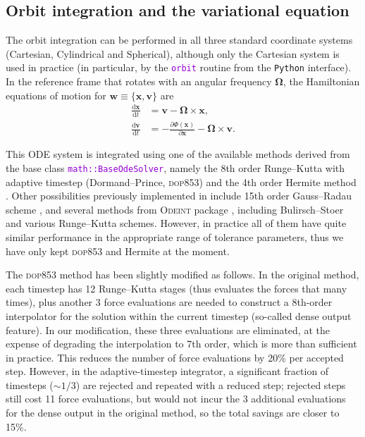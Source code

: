 \documentclass[12pt]{article}
\newcommand{\Python}{\texttt{Python}\xspace}
\newcommand{\ttt}[1]{\textcolor{darkviolet}{\texttt{#1}}}
\renewcommand{\d}{\mathrm{d}}
\newcommand{\bv}{\boldsymbol{v}}
\newcommand{\bx}{\boldsymbol{x}}
\begin{document}
\subsection{Orbit integration and the variational equation}  \label{sec:OrbitDetails}

The orbit integration can be performed in all three standard coordinate systems (Cartesian, Cylindrical and Spherical), although only the Cartesian system is used in practice (in particular, by the \ttt{orbit} routine from the \Python interface). In the reference frame that rotates with an angular frequency $\boldsymbol\Omega$, the Hamiltonian equations of motion for $\boldsymbol{w} \equiv \{\bx, \bv\}$ are
\begin{subequations}
\begin{align}
\frac{\d\bx}{\d t} &= \bv - \boldsymbol\Omega \times \bx, \\
\frac{\d\bv}{\d t} &= -\frac{\partial\Phi(\bx)}{\partial\bx} - \boldsymbol\Omega \times \bv.
\end{align}
\end{subequations}

This ODE system is integrated using one of the available methods derived from the base class \ttt{math::BaseOdeSolver}, namely the 8th order Runge--Kutta with adaptive timestep (Dormand--Prince, \textsc{dop853}) \cite{DOP853} and the 4th order Hermite method \cite{Hermite}. Other possibilities previously implemented in \cite{Vasiliev2013} include 15th order Gauss--Radau scheme \cite{IAS15}, and several methods from \textsc{Odeint} package \cite{odeint}, including Bulirsch--Stoer and various Runge--Kutta schemes. However, in practice all of them have quite similar performance in the appropriate range of tolerance parameters, thus we have only kept \textsc{dop853} and Hermite at the moment.

The \textsc{dop853} method has been slightly modified as follows. In the original method, each timestep has 12 Runge--Kutta stages (thus evaluates the forces that many times), plus another 3 force evaluations are needed to construct a 8th-order interpolator for the solution within the current timestep (so-called dense output feature). In our modification, these three evaluations are eliminated, at the expense of degrading the interpolation to 7th order, which is more than sufficient in practice. This reduces the number of force evaluations by 20\% per accepted step. However, in the adaptive-timestep integrator, a significant fraction of timesteps ($\sim1/3$) are rejected and repeated with a reduced step; rejected steps still cost 11 force evaluations, but would not incur the 3 additional evaluations for the dense output in the original method, so the total savings are closer to 15\%.
\end{document}
